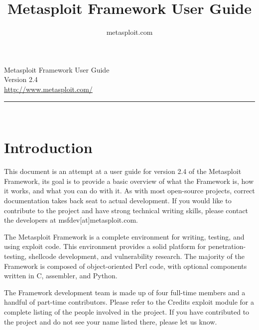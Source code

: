\documentclass{report}
\begin{document}
\title{Metasploit Framework User Guide}
\author{metasploit.com}

\begin{titlepage}
    \begin{center}
        		

        \huge{Metasploit Framework User Guide}
		\ \\[10mm]
		\large{Version 2.4}
		\\[120mm]
		
        \small{\url{http://www.metasploit.com/}}

        \rule{10cm}{1pt} \\[4mm]
        \renewcommand{\arraystretch}{0.5}
    \end{center}
\end{titlepage}

\tableofcontents

\setlength{\parindent}{0pt} \setlength{\parskip}{8pt}



\chapter{Introduction}

\par
This document is an attempt at a user guide for version 2.4 of the Metasploit
Framework, its goal is to provide a basic overview of what the Framework is, how
it works, and what you can do with it. As with most open-source projects,
correct documentation takes back seat to actual development. If you would like
to contribute to the project and have strong technical writing skills, please
contact the developers at msfdev[at]metasploit.com.

\par
The Metasploit Framework is a complete environment for writing, testing, and
using exploit code. This environment provides a solid platform for
penetration-testing, shellcode development, and vulnerability research. The
majority of the Framework is composed of object-oriented Perl code, with
optional components written in C, assembler, and Python.  

\par
The Framework development team is made up of four full-time members and a handful
of part-time contributors. Please refer to the Credits exploit module for a complete
listing of the people involved in the project. If you have contributed to the project
and do not see your name listed there, please let us know.
\end{document}

